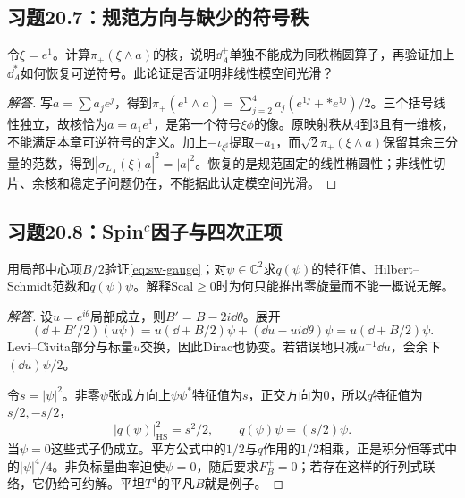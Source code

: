 \subsection*{习题20.7：规范方向与缺少的符号秩}
令$\xi=e^1$。计算$\pi_+(\xi\wedge a)$的核，说明$\dd_A^+$单独不能成为同秩椭圆算子，再验证加上$\dd_A^*$如何恢复可逆符号。此论证是否证明非线性模空间光滑？
\begin{proof}[解答]
写$a=\sum a_je^j$，得到$\pi_+(e^1\wedge a)=\sum_{j=2}^4a_j(e^{1j}+*e^{1j})/2$。三个括号线性独立，故核恰为$a=a_1e^1$，是第一个符号$\xi\phi$的像。原映射秩从4到3且有一维核，不能满足本章可逆符号的定义。加上$-\iota_{\xi^\sharp}$提取$-a_1$，而$\sqrt2\pi_+(\xi\wedge a)$保留其余三分量的范数，得到$|\sigma_{L_A}(\xi)a|^2=|a|^2$。恢复的是规范固定的线性椭圆性；非线性切片、余核和稳定子问题仍在，不能据此认定模空间光滑。
\end{proof}

\subsection*{习题20.8：Spin$^c$因子与四次正项}
用局部中心项$B/2$验证\eqref{eq:sw-gauge}；对$\psi\in\mathbb C^2$求$q(\psi)$的特征值、Hilbert--Schmidt范数和$q(\psi)\psi$。解释$\mathrm{Scal}\geq0$时为何只能推出零旋量而不能一概说无解。
\begin{proof}[解答]
设$u=e^{i\theta}$局部成立，则$B'=B-2i\dd\theta$。展开
\[
 (\dd+B'/2)(u\psi)
 =u(\dd+B/2)\psi+(\dd u-ui\dd\theta)\psi
 =u(\dd+B/2)\psi.
\]
Levi--Civita部分与标量$u$交换，因此Dirac也协变。若错误地只减$u^{-1}\dd u$，会余下$(\dd u)\psi/2$。

令$s=|\psi|^2$。非零$\psi$张成方向上$\psi\psi^*$特征值为$s$，正交方向为0，所以$q$特征值为$s/2,-s/2$，
\[
 |q(\psi)|_{\mathrm{HS}}^2=s^2/2,\qquad q(\psi)\psi=(s/2)\psi.
\]
当$\psi=0$这些式子仍成立。平方公式中的$1/2$与$q$作用的$1/2$相乘，正是积分恒等式中的$|\psi|^4/4$。非负标量曲率迫使$\psi=0$，随后要求$F_B^+=0$；若存在这样的行列式联络，它仍给可约解。平坦$T^4$的平凡$B$就是例子。
\end{proof}
